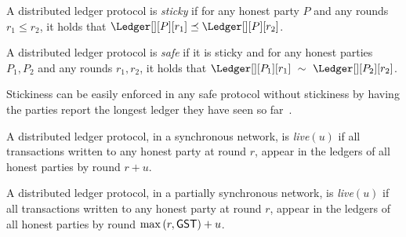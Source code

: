 \begin{definition}[Stickiness]
  A distributed ledger protocol is \emph{sticky} if
  for any honest party $P$ and any rounds $r_1 \leq r_2$,
  it holds that $\Ledger[][P][r_1] \preceq \Ledger[][P][r_2]$.
\end{definition}

\begin{definition}[Safety]
  A distributed ledger protocol is \emph{safe} if it is sticky and
  for any honest parties $P_1, P_2$ and any rounds $r_1, r_2$, it holds that
  $\Ledger[][P_1][r_1]~\sim~\Ledger[][P_2][r_2]$.
\end{definition}

Stickiness can be easily enforced in any safe protocol
without stickiness by having the parties report the longest
ledger they have seen so far~\cite{streamlet}.

\begin{definition}
  A distributed ledger protocol, in a synchronous network, is \emph{live}$(u)$ if
  all transactions written to any honest party
  at round $r$, appear in the ledgers of all honest parties by round
  $r + u$.
\end{definition}

\begin{definition}
  A distributed ledger protocol, in a partially synchronous network,
  is \emph{live}$(u)$ if all transactions written to any honest party
  at round $r$, appear in the ledgers of all honest parties by round
  $\max{(r,\textsf{GST})} + u$.
\end{definition}

